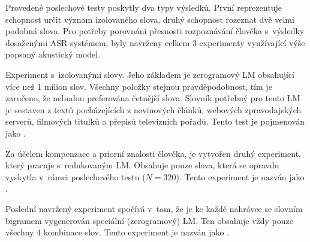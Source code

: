 Provedené poslechové testy poskytly dva typy výsledků.
První reprezentuje schopnost určit význam izolovaného slova, druhý schopnost rozeznat dvě velmi podobná slova.
Pro potřeby porovnání přesnosti rozpoznávání člověka s~výsledky dosaženými ASR systémem, byly navrženy celkem $3$ experimenty využívající výše popsaný akustický model.

Experiment
s~izolovanými slovy.
Jeho základem je zerogramový LM obsahující více než 1 milion slov.
Všechny položky stejnou pravděpodobnost, tím je zaručeno, že nebudou preferována četnější slova.
Slovník potřebný pro tento LM je sestaven z textů pocházejících z novinových článků, webových zpravodajských serverů, filmových titulků a přepisů televizních pořadů.
Tento test je pojmenován jako .

Za účelem kompenzace a priorní znalosti člověka, je vytvořen druhý experiment, který pracuje s~redukovaným LM.
Obsahuje pouze slova, která se opravdu vyskytla v~rámci poslechového testu ($N = 320$).
Tento experiment je nazván jako .

Poslední navržený experiment spočívá v~tom, že je ke každé nahrávce se slovním bigramem vygenerován speciální (zerogramový) LM.
Ten obsahuje vždy pouze všechny 4 kombinace slov.
Tento experiment je nazván jako .

